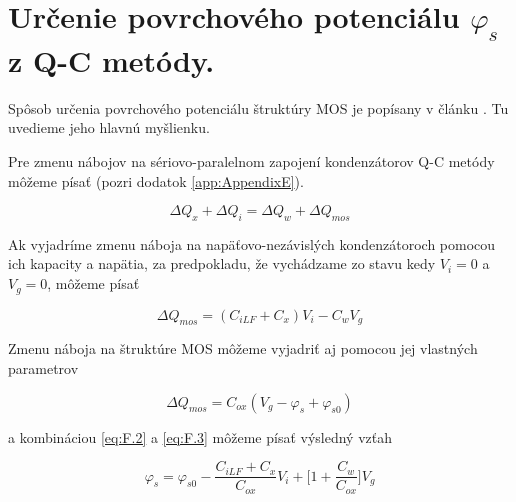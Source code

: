 
\chapter{Určenie povrchového potenciálu $\varphi_s$ z Q-C metódy.} %

\label{app:AppendixF} %


Spôsob určenia povrchového potenciálu štruktúry MOS je popísany v článku \cite{App.3}. Tu uvedieme jeho hlavnú myšlienku.

Pre zmenu nábojov na sériovo-paralelnom zapojení kondenzátorov Q-C
metódy môžeme písať (pozri dodatok \ref{app:AppendixE}).

\begin{equation}\label{eq:F.1}
\Delta Q_x + \Delta Q_i = \Delta Q_w + \Delta Q_{mos}
\end{equation}

Ak vyjadríme zmenu náboja na napäťovo-nezávislých kondenzátoroch
pomocou ich kapacity a napätia, za predpokladu, že vychádzame zo stavu
kedy $V_i=0$ a $V_g=0$, môžeme písať

\begin{equation}\label{eq:F.2}
\Delta Q_{mos} = (C_{iLF} + C_{x})V_{i} - C_{w}V_{g}
\end{equation}

Zmenu náboja na štruktúre MOS môžeme vyjadriť aj pomocou jej vlastných
parametrov

\begin{equation}\label{eq:F.3}
\Delta Q_{mos} = C_{ox}(V_{g} - \varphi_{s} + \varphi_{s0})
\end{equation}

a kombináciou \ref{eq:F.2} a \ref{eq:F.3} môžeme písať výsledný vzťah

\begin{equation}\label{eq:F.4}
\varphi_{s} = \varphi_{s0} - \frac{C_{iLF} + C_{x}}{C_{ox}}V_i + \Big[1 + \frac{C_{w}}{C_{ox}}\Big]V_{g}
\end{equation}
